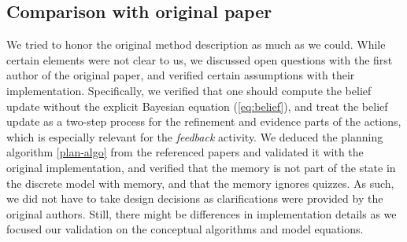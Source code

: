 \subsection{Comparison with original paper}

We tried to honor the original method description as much as we could.
While certain elements were not clear to us, we discussed open questions with the first author of the original paper, and verified certain assumptions with their implementation.
Specifically, we verified that one should compute the belief update without the explicit Bayesian equation (\ref{eq:belief}), and treat the belief update as a two-step process for the refinement and evidence parts of the actions, which is especially relevant for the \textit{feedback} activity.
We deduced the planning algorithm \ref{plan-algo} from the referenced papers and validated it with the original implementation, and verified that the memory is not part of the state in the discrete model with memory, and that the memory ignores quizzes.
As such, we did not have to take design decisions as clarifications were provided by the original authors.
Still, there might be differences in implementation details as we focused our validation on the conceptual algorithms and model equations.
